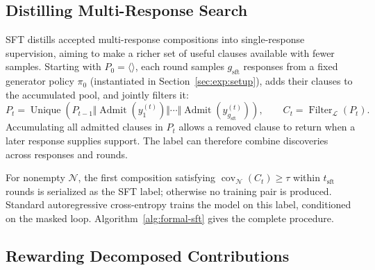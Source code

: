 \subsection{Distilling Multi-Response Search}
\label{sec:method:sft}

SFT distills accepted multi-response compositions into single-response
supervision, aiming to make a richer set of useful clauses available with
fewer samples.  Starting with \(P_0=\langle\rangle\), each round samples \(g_{\mathrm{sft}}\) responses
from a fixed generator policy \(\pi_0\) (instantiated in
Section~\ref{sec:exp:setup}), adds their clauses
to the accumulated pool, and jointly filters it:
\begin{equation}
  P_t=\operatorname{Unique}\!\left(P_{t-1}\Vert
    \operatorname{Admit}(y_1^{(t)})\Vert\cdots\Vert
    \operatorname{Admit}(y_{g_{\mathrm{sft}}}^{(t)})\right),
  \qquad
  C_t=\operatorname{Filter}_{\mathcal L}(P_t).
  \label{eq:method-sft}
\end{equation}
Accumulating all admitted clauses in \(P_t\) allows a removed clause to return
when a later response supplies support.
The label can therefore combine discoveries across responses and rounds.

For nonempty \(\mathcal N\), the first composition satisfying
\(\operatorname{cov}_{\mathcal N}(C_t)\ge\tau\) within \(t_{\mathrm{sft}}\) rounds is
serialized as the SFT label; otherwise no training pair is produced.
Standard autoregressive cross-entropy trains the model on this label,
conditioned on the masked loop.  Algorithm~\ref{alg:formal-sft} gives the
complete procedure.

\subsection{Rewarding Decomposed Contributions}
\label{sec:method:reward}

